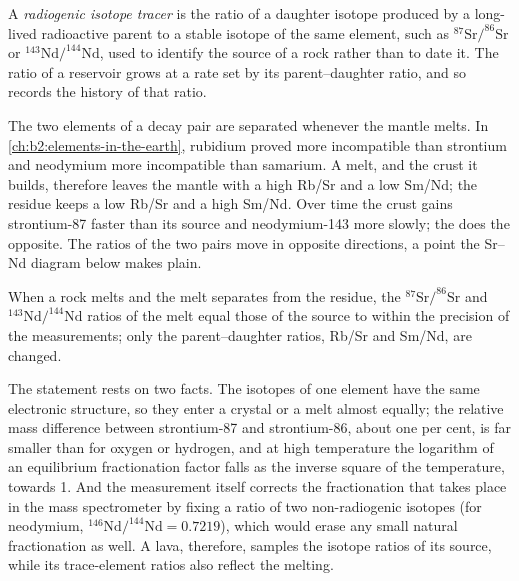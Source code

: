 \begin{definition}\label{def:b2:isotope-geochemistry:tracer}
A \emph{radiogenic isotope tracer} is the ratio
of a daughter isotope produced by a long-lived radioactive parent to a stable
isotope of the same element, such as $^{87}\mathrm{Sr}/^{86}\mathrm{Sr}$ or
$^{143}\mathrm{Nd}/^{144}\mathrm{Nd}$, used to identify the source of a rock rather
than to date it. The ratio of a reservoir grows at a rate set by its
parent--daughter ratio, and so records the history of that ratio.
\end{definition}

The two elements of a decay pair are separated whenever the mantle melts. In
\cref{ch:b2:elements-in-the-earth}, rubidium proved more incompatible than
strontium and neodymium more incompatible than samarium. A melt, and the crust
it builds, therefore leaves the mantle with a high Rb/Sr and a low Sm/Nd; the
residue keeps a low Rb/Sr and a high Sm/Nd. Over time the crust gains
strontium-87 faster than its source and neodymium-143 more slowly; the  does the opposite. The ratios of the two pairs move in opposite
directions, a point the Sr--Nd diagram below makes plain.

\begin{proposition}\label{prop:b2:isotope-geochemistry:melting}
When a rock melts and the melt separates from the residue, the
$^{87}\mathrm{Sr}/^{86}\mathrm{Sr}$ and $^{143}\mathrm{Nd}/^{144}\mathrm{Nd}$ ratios of
the melt equal those of the source to within the precision of the
measurements; only the parent--daughter ratios, Rb/Sr and Sm/Nd, are changed.
\end{proposition}
\admitted

\noindent The statement rests on two facts. The isotopes of one element have the
same electronic structure, so they enter a crystal or a melt almost equally; the
relative mass difference between strontium-87 and strontium-86, about one per
cent, is far smaller than for oxygen or hydrogen, and at high temperature the
logarithm of an equilibrium fractionation factor falls as the inverse square of
the temperature, towards 1. And the measurement itself corrects the
fractionation that takes place in the mass spectrometer by fixing a ratio of two
non-radiogenic isotopes (for neodymium, $^{146}\mathrm{Nd}/^{144}\mathrm{Nd} =
0.7219$), which would erase any small natural fractionation as well. A lava,
therefore, samples the isotope ratios of its source, while its trace-element
ratios also reflect the melting.

